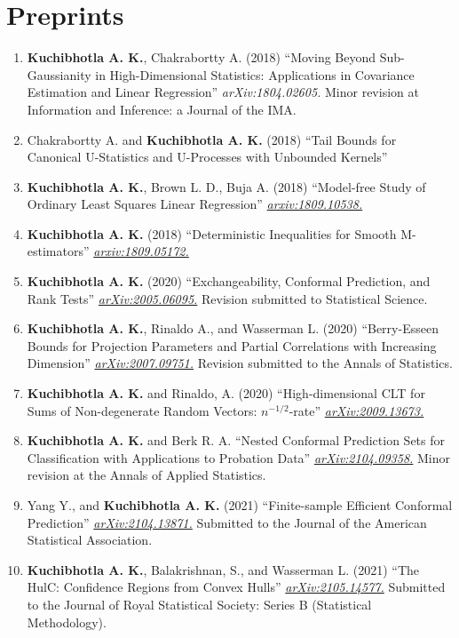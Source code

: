 \documentclass[10pt]{article}
\numberwithin{myalgctr}{section}
\begin{document}
\section*{Preprints}
\begin{enumerate}\itemsep0em
	\item \textbf{Kuchibhotla A. K.}, Chakrabortty A. (2018) ``Moving Beyond Sub-Gaussianity in High-Dimensional Statistics: Applications in Covariance Estimation and Linear Regression'' \emph{arXiv:1804.02605.} Minor revision at Information and Inference: a Journal of the IMA.
	\item Chakrabortty A. and \textbf{Kuchibhotla A. K.} (2018) ``Tail Bounds for Canonical U-Statistics and U-Processes with Unbounded Kernels''
	\item \textbf{Kuchibhotla A. K.}, Brown L. D., Buja A. (2018) ``Model-free Study of Ordinary Least Squares Linear Regression'' \href{https://arxiv.org/abs/1809.10538}{\emph{arxiv:1809.10538.}}
	\item \textbf{Kuchibhotla A. K.} (2018) ``Deterministic Inequalities for Smooth M-estimators'' \href{https://arxiv.org/abs/1809.05172}{\emph{arxiv:1809.05172.}} 
  \item \textbf{Kuchibhotla A. K.} (2020) ``Exchangeability, Conformal Prediction, and Rank Tests'' \href{https://arxiv.org/abs/2005.06095}{\emph{arXiv:2005.06095.}} Revision submitted to Statistical Science.
  \item \textbf{Kuchibhotla A. K.}, Rinaldo A., and Wasserman L. (2020) ``Berry-Esseen Bounds for Projection Parameters and Partial Correlations with Increasing Dimension'' \href{https://arxiv.org/abs/2007.09751}{\emph{arXiv:2007.09751.}} Revision submitted to the Annals of Statistics.
  \item \textbf{Kuchibhotla A. K.} and Rinaldo, A. (2020) ``High-dimensional CLT for Sums of Non-degenerate Random Vectors: $n^{-1/2}$-rate'' \href{https://arxiv.org/abs/2009.13673}{\emph{arXiv:2009.13673.}}
  \item \textbf{Kuchibhotla A. K.} and Berk R. A. ``Nested Conformal Prediction Sets for Classification with Applications to Probation Data'' \href{https://arxiv.org/abs/2104.09358}{\emph{arXiv:2104.09358.}} Minor revision at the Annals of Applied Statistics.
  \item Yang Y., and \textbf{Kuchibhotla A. K.} (2021) ``Finite-sample Efficient Conformal Prediction'' \href{https://arxiv.org/abs/2104.13871}{\emph{arXiv:2104.13871.}} Submitted to the Journal of the American Statistical Association.
  \item \textbf{Kuchibhotla A. K.}, Balakrishnan, S., and Wasserman L. (2021) ``The HulC: Confidence Regions from Convex Hulls'' \href{https://arxiv.org/abs/2105.14577}{\emph{arXiv:2105.14577.}} Submitted to the Journal of Royal Statistical Society: Series B (Statistical Methodology).

\end{enumerate}
\end{document}

